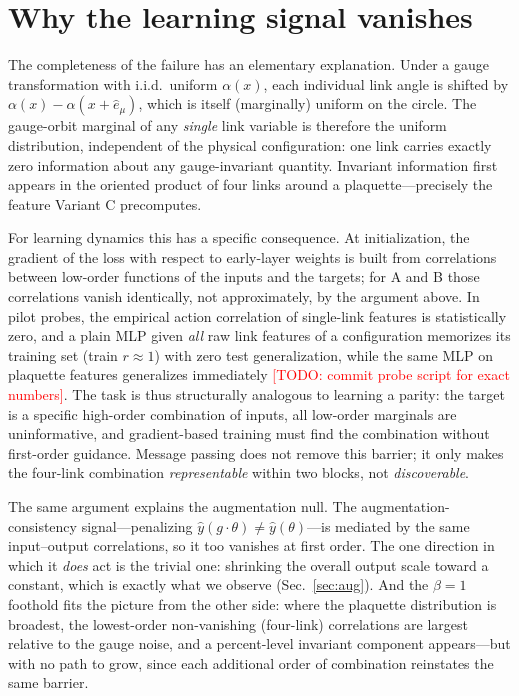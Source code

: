 \documentclass[aps,prd,twocolumn,superscriptaddress,nofootinbib]{revtex4-2}
\newcommand{\todo}[1]{\textcolor{red}{[TODO: #1]}}
\begin{document}
\section{Why the learning signal vanishes}
\label{sec:why}

The completeness of the failure has an elementary explanation. Under a
gauge transformation with i.i.d.\ uniform $\alpha(x)$, each individual
link angle is shifted by $\alpha(x) - \alpha(x{+}\hat e_\mu)$, which is
itself (marginally) uniform on the circle. The gauge-orbit marginal of
any \emph{single} link variable is therefore the uniform distribution,
independent of the physical configuration: one link carries exactly zero
information about any gauge-invariant quantity. Invariant information
first appears in the oriented product of four links around a
plaquette---precisely the feature Variant C precomputes.

For learning dynamics this has a specific consequence. At
initialization, the gradient of the loss with respect to early-layer
weights is built from correlations between low-order functions of the
inputs and the targets; for A and B those correlations vanish
identically, not approximately, by the argument above. In pilot probes,
the empirical action correlation of single-link features is
statistically zero, and a plain MLP given \emph{all} raw link features
of a configuration memorizes its training set (train $r \approx 1$) with
zero test generalization, while the same MLP on plaquette features
generalizes immediately \todo{commit probe script for exact numbers}.
The task is thus structurally analogous to learning a parity: the target
is a specific high-order combination of inputs, all low-order marginals
are uninformative, and gradient-based training must find the combination
without first-order guidance. Message passing does not remove this
barrier; it only makes the four-link combination \emph{representable}
within two blocks, not \emph{discoverable}.

The same argument explains the augmentation null. The
augmentation-consistency signal---penalizing
$\hat y(g\cdot\theta) \ne \hat y(\theta)$---is mediated by the same
input--output correlations, so it too vanishes at first order. The one
direction in which it \emph{does} act is the trivial one: shrinking the
overall output scale toward a constant, which is exactly what we observe
(Sec.~\ref{sec:aug}). And the $\beta=1$ foothold fits the picture from
the other side: where the plaquette distribution is broadest, the
lowest-order non-vanishing (four-link) correlations are largest relative
to the gauge noise, and a percent-level invariant component appears---but
with no path to grow, since each additional order of combination
reinstates the same barrier.
\end{document}

